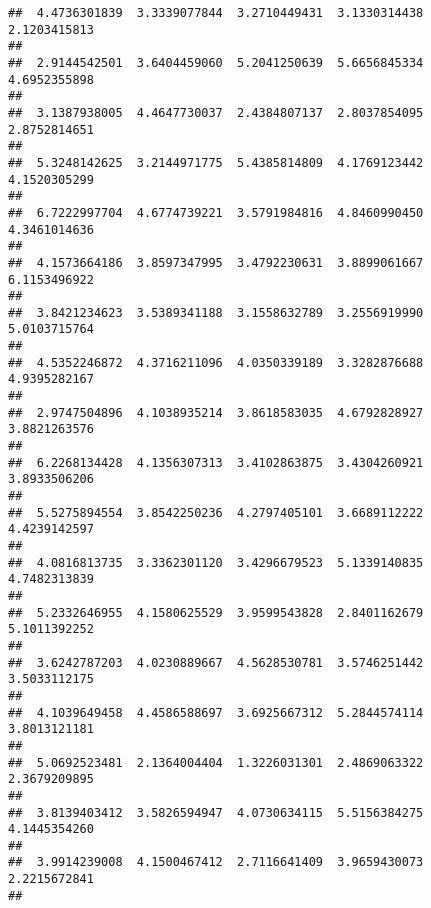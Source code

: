 \documentclass[]{article}
\begin{document}
\begin{verbatim}
##  4.4736301839  3.3339077844  3.2710449431  3.1330314438  2.1203415813 
##                                                                       
##  2.9144542501  3.6404459060  5.2041250639  5.6656845334  4.6952355898 
##                                                                       
##  3.1387938005  4.4647730037  2.4384807137  2.8037854095  2.8752814651 
##                                                                       
##  5.3248142625  3.2144971775  5.4385814809  4.1769123442  4.1520305299 
##                                                                       
##  6.7222997704  4.6774739221  3.5791984816  4.8460990450  4.3461014636 
##                                                                       
##  4.1573664186  3.8597347995  3.4792230631  3.8899061667  6.1153496922 
##                                                                       
##  3.8421234623  3.5389341188  3.1558632789  3.2556919990  5.0103715764 
##                                                                       
##  4.5352246872  4.3716211096  4.0350339189  3.3282876688  4.9395282167 
##                                                                       
##  2.9747504896  4.1038935214  3.8618583035  4.6792828927  3.8821263576 
##                                                                       
##  6.2268134428  4.1356307313  3.4102863875  3.4304260921  3.8933506206 
##                                                                       
##  5.5275894554  3.8542250236  4.2797405101  3.6689112222  4.4239142597 
##                                                                       
##  4.0816813735  3.3362301120  3.4296679523  5.1339140835  4.7482313839 
##                                                                       
##  5.2332646955  4.1580625529  3.9599543828  2.8401162679  5.1011392252 
##                                                                       
##  3.6242787203  4.0230889667  4.5628530781  3.5746251442  3.5033112175 
##                                                                       
##  4.1039649458  4.4586588697  3.6925667312  5.2844574114  3.8013121181 
##                                                                       
##  5.0692523481  2.1364004404  1.3226031301  2.4869063322  2.3679209895 
##                                                                       
##  3.8139403412  3.5826594947  4.0730634115  5.5156384275  4.1445354260 
##                                                                       
##  3.9914239008  4.1500467412  2.7116641409  3.9659430073  2.2215672841 
##                                                                       

\end{verbatim}
\end{document}
